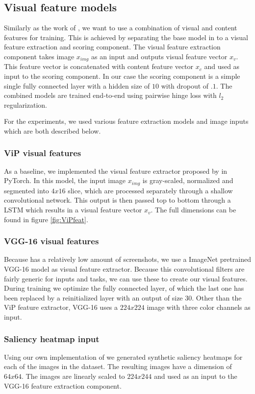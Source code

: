 \subsection{Visual feature models}
Similarly as the work of \citet{fan2017learning}, we want to use a combination of visual and content features for training. This is achieved by separating the base model in to a visual feature extraction and scoring component. The visual feature extraction component takes image $x_{img}$ as an input and outputs visual feature vector $x_{v}$. This feature vector is concatenated with content feature vector $x_{c}$ and used as input to the scoring component. In our case the scoring component is a simple single fully connected layer with a hidden size of $10$ with dropout of $.1$. The combined models are trained end-to-end using pairwise hinge loss with $l_2$ regularization. 

For the experiments, we used various feature extraction models and image inputs which are both described below.


\subsubsection{ViP visual features}
As a baseline, we implemented the visual feature extractor proposed by \citet{fan2017learning} in PyTorch. In this model, the input image $x_{img}$ is gray-scaled, normalized and segmented into $4x16$ slice, which are processed separately through a shallow convolutional network. This output is then passed top to bottom through a LSTM which results in a visual feature vector $x_{v}$. The full dimensions can be found in figure \ref{fig:ViPfeat}.

\subsubsection{VGG-16 visual features}
Because \datasetname has a relatively low amount of screenshots, we use a ImageNet pretrained VGG-16 \cite{simonyan2014very} model as visual feature extractor. Because this convolutional filters are fairly generic for inputs and tasks, we can use these to create our visual features. During training we optimize the fully connected layer, of which the last one has been replaced by a reinitialized layer with an output of size $30$.  Other than the ViP feature extractor, VGG-16 uses a $224x224$ image with three color channels as input. 

\subsubsection{Saliency heatmap input}
Using our own implementation of \citet{shan2017two} we generated synthetic saliency heatmaps for each of the images in the \datasetname dataset. The resulting images have a dimension of $64x64$. The images are linearly scaled to $224x244$ and used as an input to the VGG-16 feature extraction component. 

